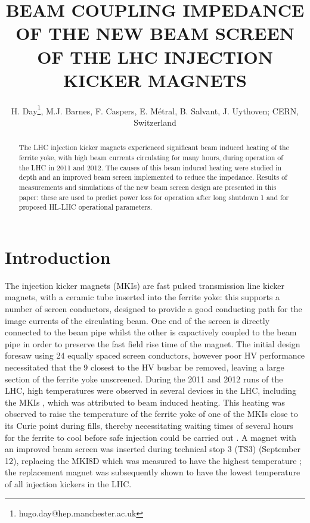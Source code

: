 \documentclass[a4paper,
              ]{jacow}
\begin{document}
\title{BEAM COUPLING IMPEDANCE OF THE NEW BEAM SCREEN OF THE LHC INJECTION KICKER MAGNETS}
\author{H. Day\thanks{hugo.day@hep.manchester.ac.uk}, M.J. Barnes, F. Caspers, E. Métral, B. Salvant, J. Uythoven;  CERN, Switzerland}

\maketitle 


\begin{abstract}
The LHC injection kicker magnets experienced significant beam induced heating of the ferrite yoke, with high beam currents circulating for many hours, during operation of the LHC in 2011 and 2012. The causes of this beam induced heating were studied in depth and an improved beam screen implemented to reduce the impedance. Results of measurements and simulations of the new beam screen design are presented in this paper: these are used to predict power loss for operation after long shutdown 1 and for proposed HL-LHC operational parameters.
\end{abstract}

\section{Introduction}

The injection kicker magnets (MKIs) are fast pulsed transmission line kicker magnets, with a ceramic tube inserted into the ferrite yoke: this supports a number of screen conductors, designed to provide a good conducting path for the image currents of the circulating beam. One end of the screen is directly connected to the beam pipe whilst the other is capactively coupled to the beam pipe in order to preserve the fast field rise time of the magnet. The initial design foresaw using 24 equally spaced screen conductors, however poor HV performance necessitated that the 9 closest to the HV busbar be removed, leaving a large section of the ferrite yoke unscreened. During the 2011 and 2012 runs of the LHC, high temperatures were observed in several devices in the LHC, including the MKIs \cite{mki-heating}, which was attributed to beam induced heating. This heating was observed to raise the temperature of the ferrite yoke of one of the MKIs close to its Curie point during fills, thereby necessitating waiting times of several hours for the ferrite to cool before safe injection could be carried out \cite{mki-heating}. A magnet with an improved beam screen was inserted during technical stop 3 (TS3) (September 12), replacing the MKI8D which was measured to have the highest temperature \cite{mki-heatingTemp}; the replacement magnet was subsequently shown to have the lowest temperature of all injection kickers in the LHC.
\end{document}
